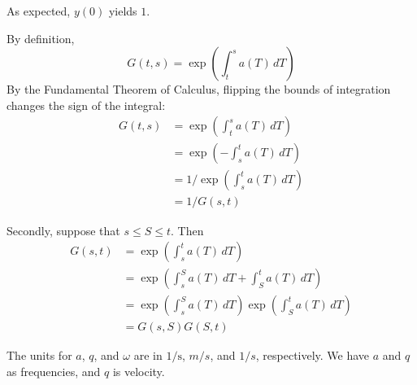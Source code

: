 \documentclass[a4paper]{article}
\begin{document}
\vspace{12pt}

As expected, \(y \!\left( 0 \right) \) yields \(1\).

\vspace{12pt}


By definition,
\[
	G \!\left( t,s \right) = \exp\left( \int^{s}_{t} a \!\left( T \right)  \, dT  \right)
\]
By the Fundamental Theorem of Calculus, flipping the bounds of integration changes the sign of the integral:
\begin{align*}
	G \!\left( t,s \right) & = \exp\left( \int^{s}_{t} a \!\left( T \right)  \, dT  \right) \\
		 & = \exp\left( -\int^{t}_{s} a \!\left( T \right)  \, dT  \right) \\
		 & = 1 / \exp\left( \int^{t}_{s} a \!\left( T \right)  \, dT  \right) \\
		 & = 1 / G \!\left( s, t \right)  
\end{align*}

Secondly, suppose that \(s \le S \le t\). Then
\begin{align*}
	G \!\left( s, t \right)  & = \exp\left( \int^{t}_{s} a \!\left( T \right) \, dT  \right) \\
	 & = \exp\left( \int^{S}_{s} a \!\left( T \right)  \, dT + \int^{t}_{S} a \!\left( T \right)  \, dT  \right)  \\
	 & = \exp\left( \int^{S}_{s} a \!\left( T \right)  \, dT  \right) \exp\left( \int^{t}_{S} a \!\left( T \right)  \, dT  \right) \\
	 & = G \!\left( s, S \right) G \!\left( S, t \right) 
\end{align*}


The units for \(a\), \(q \), and \(\omega \) are in \(1 / \text{s}\), \(m/s\), and \(1/s\), respectively. We have \(a\) and \(q \) as frequencies, and \(q \) is velocity.

\vspace{12pt}

\end{document}
